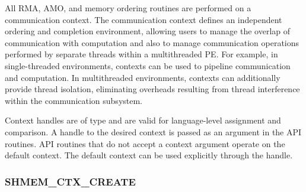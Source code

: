 \color{ForestGreen}

All \openshmem RMA, AMO, and memory ordering routines are
performed on a communication context.  The communication context defines an
independent ordering and completion environment, allowing users to manage the
overlap of communication with computation and also to manage communication
operations performed by separate threads within a multithreaded \ac{PE}.  For
example, in single-threaded environments, contexts can be used to pipeline
communication and computation.  In multithreaded environments, contexts can
additionally provide thread isolation, eliminating overheads resulting from
thread interference within the communication subsystem.

Context handles are of type  and are valid for
language-level assignment and comparison.  A handle to the desired context is
passed as an argument in the  API routines.  API routines
that do not accept a context argument operate on the default context.  The
default context can be used explicitly through the 
handle.

\subsubsection{\textbf{SHMEM\_CTX\_CREATE}}
\label{subsec:shmem_ctx_create}

